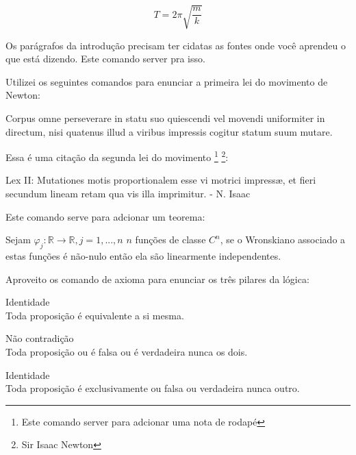 \documentclass[
   12pt,                         %
   openright,                    %
   oneside,                      %
   a4paper,                      %
   sumario = tradicional,        %
   chapter=TITLE,                %
   section=TITLE,                %
   subsection=TITLE,             %
   subsubsection=TITLE,          %
   english,                      %
   french,                       %
   spanish,                      %
   brazil,                       %
   xcolor=table                  %
]{abntex2}
\begin{document}
      \begin{equation}
         \label{eq:part2}
         T=2\pi \sqrt{\frac{m}{k}}
      \end{equation}

      Os parágrafos da introdução precisam ter cidatas as fontes onde você 
      aprendeu o que está dizendo. Este comando server pra 
      isso.\cite{LoiElectricite}\cite{moyses1}
      
      Utilizei os seguintes comandos para enunciar a primeira lei do movimento 
      de Newton:
      
      \begin{lei}
         Corpus omne perseverare in statu suo quiescendi vel movendi uniformiter in directum, nisi quatenus illud a viribus impressis cogitur statum suum mutare.\cite{principia1}
      \end{lei}

      Essa é uma citação da segunda lei do movimento
      \footnote{Este comando server para adcionar uma nota de rodapé}
      \footnote{Sir Isaac Newton}:

      \begin{citacao}
         Lex II: Mutationes motis proportionalem esse vi motrici impressæ, et fieri secundum lineam retam qua vis illa imprimitur. - N. Isaac\cite{principia1}
      \end{citacao}
      
      Este comando serve para adcionar um teorema:
      
      \begin{teorema}
         Sejam $\varphi_j : \mathbb{R} \rightarrow \mathbb{R}, j = 1, ..., n$\: $n$ funções de classe $C^n$, se o Wronskiano 
         associado a estas funções é não-nulo então ela são linearmente independentes.
      \end{teorema}

      Aproveito os comando de axioma para enunciar os três pilares da lógica:

      \begin{axioma}Identidade\\
      Toda proposição é equivalente a si mesma.
      \end{axioma}

      \begin{axioma}Não contradição\\
      Toda proposição ou é falsa ou é verdadeira nunca os dois.
      \end{axioma}

      \begin{axioma}Identidade\\
      Toda proposição é exclusivamente ou falsa ou verdadeira nunca outro.
      \end{axioma}
\end{document}
